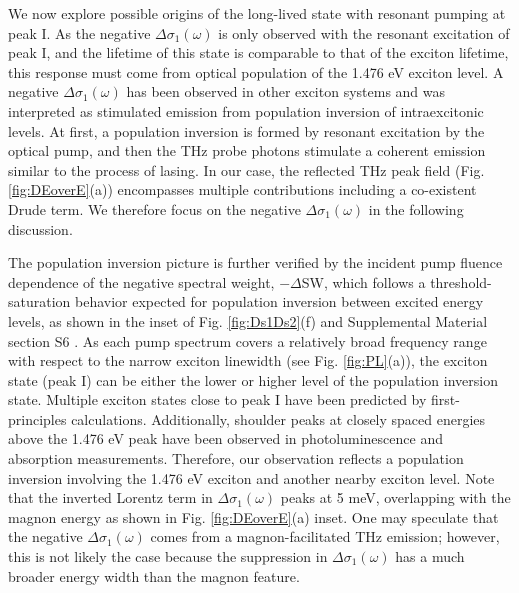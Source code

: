 \documentclass[
 reprint,
superscriptaddress,

 amsmath,amssymb,
 aps,

]{revtex4-2}
\begin{document}
We now explore possible origins of the long-lived state with resonant pumping at peak I. As the negative $\Delta\sigma_1(\omega)$ is only observed with the resonant excitation of peak I, and the lifetime of this state is comparable to that of the exciton lifetime\cite{Wang2021,Hwangbo2021,Li2024}, this response must come from optical population of the 1.476 eV exciton level. A negative $\Delta\sigma_1(\omega)$ has been observed in other exciton systems and was interpreted as stimulated emission from population inversion of intraexcitonic levels\cite{Huber2006}. At first, a population inversion is formed by resonant excitation by the optical pump, and then the THz probe photons stimulate a coherent emission similar to the process of lasing. In our case, the reflected THz peak field (Fig. \ref{fig:DEoverE}(a)) encompasses multiple contributions including a co-existent Drude term. We therefore focus on the negative $\Delta\sigma_1(\omega)$ in the following discussion.

The population inversion picture is further verified by the incident pump fluence dependence of the negative spectral weight, $-\Delta$SW, which follows a threshold-saturation behavior expected for population inversion between excited energy levels, as shown in the inset of Fig. \ref{fig:Ds1Ds2}(f) and Supplemental Material section S6 \cite{Supp}. As each pump spectrum covers a relatively broad frequency range with respect to the narrow exciton linewidth (see Fig. \ref{fig:PL}(a)), the exciton state (peak I) can be either the lower or higher level of the population inversion state. Multiple exciton states close to peak I have been predicted by first-principles calculations\cite{Lane2022,Hamad2024}. Additionally, shoulder peaks at closely spaced energies above the 1.476 eV peak have been observed in photoluminescence and absorption measurements\cite{Kang2020}. Therefore, our observation reflects a population inversion involving the 1.476 eV exciton and another nearby exciton level. Note that the inverted Lorentz term in $\Delta\sigma_1(\omega)$ peaks at 5 meV, overlapping with the magnon energy as shown in Fig. \ref{fig:DEoverE}(a) inset. One may speculate that the negative $\Delta\sigma_1(\omega)$ comes from a magnon-facilitated THz emission; however, this is not likely the case because the suppression in $\Delta\sigma_1(\omega)$ has a much broader energy width than the magnon feature\cite{Belvin2021}.
\end{document}
